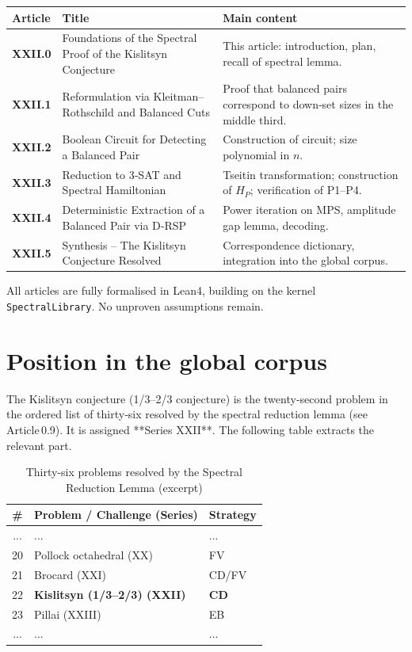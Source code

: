 \documentclass[11pt,a4paper]{article}
\begin{document}
\begin{center}
\small
\begin{tabular}{@{}>{\bfseries}l>{\raggedright\arraybackslash}p{4.5cm}>{\raggedright\arraybackslash}p{6cm}@{}}
\toprule
\textbf{Article} & \textbf{Title} & \textbf{Main content} \\
\midrule
XXII.0 & Foundations of the Spectral Proof of the Kislitsyn Conjecture & This article: introduction, plan, recall of spectral lemma. \\
XXII.1 & Reformulation via Kleitman–Rothschild and Balanced Cuts & Proof that balanced pairs correspond to down‑set sizes in the middle third. \\
XXII.2 & Boolean Circuit for Detecting a Balanced Pair & Construction of circuit; size polynomial in $n$. \\
XXII.3 & Reduction to 3‑SAT and Spectral Hamiltonian & Tseitin transformation; construction of $H_P$; verification of P1–P4. \\
XXII.4 & Deterministic Extraction of a Balanced Pair via D‑RSP & Power iteration on MPS, amplitude gap lemma, decoding. \\
XXII.5 & Synthesis – The Kislitsyn Conjecture Resolved & Correspondence dictionary, integration into the global corpus. \\
\bottomrule
\end{tabular}
\end{center}

All articles are fully formalised in Lean4, building on the kernel \texttt{SpectralLibrary}. No unproven assumptions remain.

\section{Position in the global corpus}

The Kislitsyn conjecture (1/3–2/3 conjecture) is the twenty‑second problem in the ordered list of thirty‑six resolved by the spectral reduction lemma (see Article 0.9). It is assigned **Series XXII**. The following table extracts the relevant part.

\begin{center}
\begin{longtable}{@{}cll@{}}
\caption{Thirty‑six problems resolved by the Spectral Reduction Lemma (excerpt)}\\
\toprule
\# & Problem / Challenge (Series) & Strategy \\
\midrule
... & ... & ... \\
20 & Pollock octahedral (XX) & FV \\
21 & Brocard (XXI) & CD/FV \\
22 & \textbf{Kislitsyn (1/3–2/3) (XXII)} & \textbf{CD} \\
23 & Pillai (XXIII) & EB \\
... & ... & ... \\
\bottomrule
\end{longtable}
\end{center}
\end{document}
